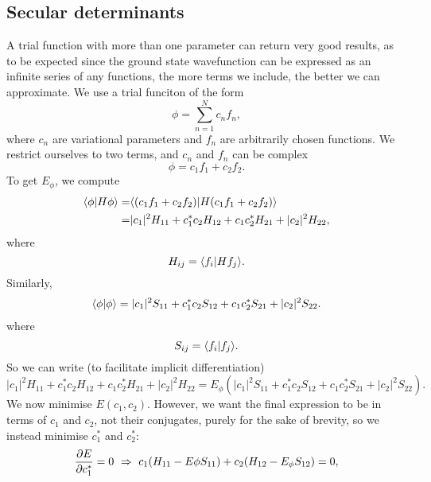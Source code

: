 \subsection{Secular determinants}
A trial function with more than one parameter can return very good results, as 
to be expected since the ground state wavefunction can be expressed as an infinite 
series of any functions, the more terms we include, the better we can approximate. 
We use a trial funciton of the form
\begin{equation}
\phi=\sum^N_{n=1}c_nf_n, 
\end{equation}
where $c_n$ are variational parameters and $f_n$ are arbitrarily chosen functions. 
We restrict ourselves to two terms, and $c_n$ and $f_n$ can be complex
\begin{equation}
\phi=c_1f_1+c_2f_2.
\end{equation}
To get $E_{\phi}$, we compute
\begin{equation}
\begin{aligned}
\langle \phi|H\phi\rangle=&\langle(c_1f_1+c_2f_2) |H(c_1f_1+c_2f_2) \rangle\\
=&|c_1|^2H_{11}+c_1^*c_2H_{12}+c_1c_2^*H_{21}+|c_2|^2H_{22},
\end{aligned}
\end{equation}
where 
\begin{equation}
H_{ij}=\langle f_i|Hf_j\rangle.
\end{equation}
Similarly, 
\begin{equation}
\begin{aligned}
\langle \phi|\phi\rangle=|c_1|^2S_{11}+c_1^*c_2S_{12}+c_1c_2^*S_{21}+|c_2|^2S_{22}.
\end{aligned}
\end{equation}
where 
\begin{equation}
S_{ij}=\langle f_i|f_j\rangle.
\end{equation}
So we can write (to facilitate implicit differentiation)
\begin{equation}
|c_1|^2H_{11}+c_1^*c_2H_{12}+c_1c_2^*H_{21}+|c_2|^2H_{22}=E_{\phi}(|c_1|^2S_{11}+c_1^*c_2S_{12}+c_1c_2^*S_{21}+|c_2|^2S_{22}).
\end{equation}
We now minimise $E(c_1,c_2)$. However, we want the final expression to be in terms 
of $c_1$ and $c_2$, not their conjugates, purely for the sake of brevity, so 
we instead minimise $c_1^*$ and $c_2^*$:
\begin{equation}
\diffp{E}{c_1^*}=0\ \imp\ c_1(H_{11}-E{\phi}S_{11})+c_2(H_{12}-E_{\phi}S_{12})=0,
\end{equation}
